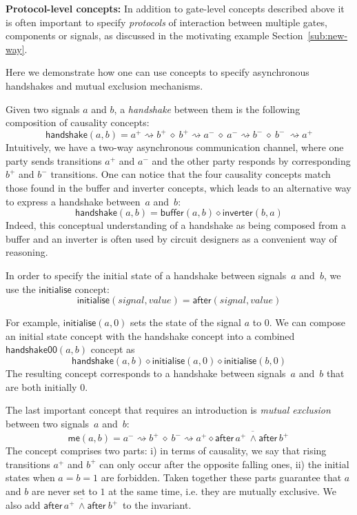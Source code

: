 \documentclass[british, journal]{IEEEtran}
\begin{document}
\textbf{Protocol-level concepts:} In addition to gate-level concepts
described above it is often important to specify \emph{protocols}
of interaction between multiple gates, components or signals, as
discussed in the motivating example Section~\ref{sub:new-way}.

Here we demonstrate how one can use concepts to specify asynchronous handshakes
and mutual exclusion mechanisms.

Given two signals $a$ and $b$, a \emph{handshake} between them is
the following composition of causality concepts:
\[
\mathsf{handshake}(a, b)=a^{+}\!\rightsquigarrow\! b^{+}\ \diamond\
b^{+}\!\rightsquigarrow\! a^{-}\ \diamond\ a^{-}\!\rightsquigarrow\! b^{-}\
\diamond\ b^{-}\ \rightsquigarrow\! a^{+}
\]
Intuitively, we have a two-way asynchronous communication channel,
where one party sends transitions $a^{+}$ and $a^{-}$ and the other
party responds by corresponding $b^{+}$ and $b^{-}$ transitions.
One can notice that the four causality concepts match those found
in the buffer and inverter concepts, which leads to an alternative
way to express a handshake between~$a$ and~$b$:
\[
\mathsf{handshake}(a, b)=\mathsf{buffer}(a, b) \diamond\mathsf{inverter}(b, a)
\]
Indeed, this conceptual understanding of a handshake as being composed
from a buffer and an inverter is often used by circuit designers as
a convenient way of reasoning.

In order to specify the initial state of a handshake between signals~$a$
and~$b$, we use the $\mathsf{initialise}$ concept:
\[
\mathsf{initialise}(\mathit{signal},\mathit{value})=\mathsf{after}(signal,
value)
\]

\noindent For example, $\mathsf{initialise}(a, 0)$ sets the state of the signal
$a$ to $0$. We can compose an initial state concept with the handshake concept
into a combined $\mathsf{handshake00}(a, b)$ concept as
\[
\mathsf{handshake}(a, b) \diamond \mathsf{initialise}(a, 0) \diamond
\mathsf{initialise}(b, 0)
\]
The resulting concept corresponds to a handshake between signals~$a$
and~$b$ that are both initially $0$.

The last important concept that requires an introduction is \emph{mutual
exclusion} between two signals~$a$ and~$b$:
\[
\mathsf{me}(a, b) = a^{-}\rightsquigarrow b^{+}\ \diamond\ b^{-}\rightsquigarrow
a^{+}\diamond\overline{\mathsf{after}\,a^{+} \, \wedge\mathsf{after}\,b^{+}\, }
\]
The concept comprises two parts: i) in terms of causality, we say
that rising transitions $a^{+}$ and $b^{+}$ can only occur after
the opposite falling ones, ii) the initial states when $a=b=1$ are
forbidden. Taken together these parts guarantee that $a$ and
$b$ are never set to $1$ at the same time, i.e. they are mutually
exclusive. We also add $\overline{\mathsf{after}\, a^{+} \,
\wedge\mathsf{after}\ b^{+}\,}$
to the invariant.
\end{document}
